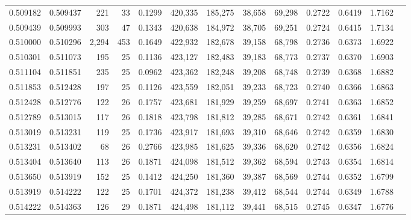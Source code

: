 \begin{tabular}{rrrrrrrrrrrrr}
0.509182 & 0.509437 &   221 &  33 &                                     0.1299 & 420,335 & 185,275 &  38,658 &  69,298 & 0.2722 & 0.6419 & 1.7162 \\
0.509439 & 0.509993 &   303 &  47 &                                     0.1343 & 420,638 & 184,972 &  38,705 &  69,251 & 0.2724 & 0.6415 & 1.7134 \\
0.510000 & 0.510296 & 2,294 & 453 &                                     0.1649 & 422,932 & 182,678 &  39,158 &  68,798 & 0.2736 & 0.6373 & 1.6922 \\
0.510301 & 0.511073 &   195 &  25 &                                     0.1136 & 423,127 & 182,483 &  39,183 &  68,773 & 0.2737 & 0.6370 & 1.6903 \\
0.511104 & 0.511851 &   235 &  25 &                                     0.0962 & 423,362 & 182,248 &  39,208 &  68,748 & 0.2739 & 0.6368 & 1.6882 \\
0.511853 & 0.512428 &   197 &  25 &                                     0.1126 & 423,559 & 182,051 &  39,233 &  68,723 & 0.2740 & 0.6366 & 1.6863 \\
0.512428 & 0.512776 &   122 &  26 &                                     0.1757 & 423,681 & 181,929 &  39,259 &  68,697 & 0.2741 & 0.6363 & 1.6852 \\
0.512789 & 0.513015 &   117 &  26 &                                     0.1818 & 423,798 & 181,812 &  39,285 &  68,671 & 0.2742 & 0.6361 & 1.6841 \\
0.513019 & 0.513231 &   119 &  25 &                                     0.1736 & 423,917 & 181,693 &  39,310 &  68,646 & 0.2742 & 0.6359 & 1.6830 \\
0.513231 & 0.513402 &    68 &  26 &                                     0.2766 & 423,985 & 181,625 &  39,336 &  68,620 & 0.2742 & 0.6356 & 1.6824 \\
0.513404 & 0.513640 &   113 &  26 &                                     0.1871 & 424,098 & 181,512 &  39,362 &  68,594 & 0.2743 & 0.6354 & 1.6814 \\
0.513650 & 0.513919 &   152 &  25 &                                     0.1412 & 424,250 & 181,360 &  39,387 &  68,569 & 0.2744 & 0.6352 & 1.6799 \\
0.513919 & 0.514222 &   122 &  25 &                                     0.1701 & 424,372 & 181,238 &  39,412 &  68,544 & 0.2744 & 0.6349 & 1.6788 \\
0.514222 & 0.514363 &   126 &  29 &                                     0.1871 & 424,498 & 181,112 &  39,441 &  68,515 & 0.2745 & 0.6347 & 1.6776 \\

\end{tabular}
